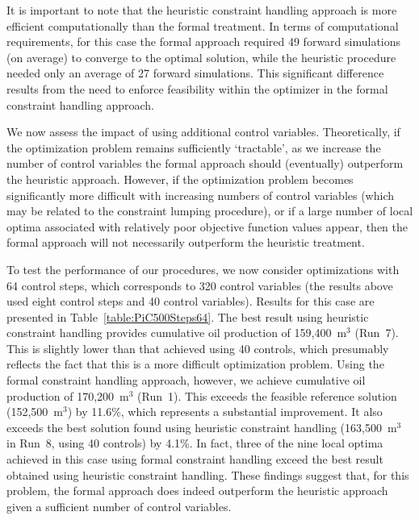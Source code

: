 \documentclass[twocolumn,numbook]{svjour3}          %
\begin{document}
It is important to note that the heuristic constraint handling approach is
more efficient computationally than the formal treatment. In terms of computational requirements, for this case the formal approach required 49 forward simulations (on average) to converge to the optimal solution, while the heuristic procedure needed only an average of 27 forward simulations. This significant difference results from the need to enforce feasibility within the optimizer in the formal constraint handling approach.


We now assess the impact of using additional control variables. Theoretically, if the optimization problem remains sufficiently `tractable', as we increase the number of control variables the formal approach should (eventually) outperform the heuristic approach. However, if the optimization problem becomes significantly more difficult with increasing numbers of control variables (which may be related to the constraint lumping procedure), or if a large number of local optima associated with relatively poor objective function values appear, then the formal approach will not necessarily outperform the heuristic treatment. 

To test the performance of our procedures, we now consider optimizations with 64 control steps, which corresponds to 320 control variables (the results above used eight control steps and 40 control variables). Results for this case are presented in Table~\ref{table:PiC500Steps64}. The best result using heuristic constraint handling provides cumulative oil production of 159,400~m$^3$ (Run~7). This is slightly lower than that achieved using 40 controls, which presumably reflects the fact that this is a more difficult optimization problem. Using the formal constraint handling approach, however, we achieve cumulative oil production of 170,200~m$^3$ (Run~1). This exceeds the feasible reference solution (152,500~m$^3$) by 11.6\%, which represents a substantial improvement. It also exceeds the best solution found using heuristic constraint handling (163,500~m$^3$ in Run~8, using 40 controls) by 4.1\%. In fact, three of the nine local optima achieved in this case using formal constraint handling exceed the best result obtained using heuristic constraint handling. These findings suggest that, for this problem, the formal approach does indeed outperform the heuristic approach given a sufficient number of control variables. 
\end{document}
